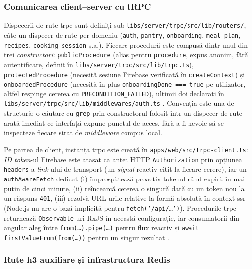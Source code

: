 \subsubsection{Comunicarea client–server cu tRPC}\label{subsec:comunicare-trpc}

Dispecerii de rute \gls{trpc} sunt definiți sub \texttt{libs/server/trpc/src/lib/routers/}, câte un dispecer de rute per domeniu (\texttt{auth}, \texttt{pantry}, \texttt{onboarding}, \texttt{meal-plan}, \texttt{recipes}, \texttt{cooking-session} ș.a.). Fiecare procedură este compusă dintr-unul din trei \textit{constructori}: \texttt{publicProcedure} (alias pentru \texttt{procedure}, expus anonim, fără autentificare, definit în \texttt{libs/server/trpc/src/lib/trpc.ts}), \texttt{protectedProcedure} (necesită sesiune Firebase verificată în \texttt{createContext}) și \texttt{onboardedProcedure} (necesită în plus \texttt{onboardingDone === true} pe utilizator, altfel respinge cererea cu \texttt{PRECONDITION\_FAILED}), ultimii doi declarați în \texttt{libs/\allowbreak server/\allowbreak trpc/\allowbreak src/\allowbreak lib/\allowbreak middlewares/\allowbreak auth.ts} \cite{trpc,trpc_middleware}. Convenția este una de structură: o căutare cu \texttt{grep} prin constructorul folosit într-un dispecer de rute arată imediat ce interfață expune punctul de acces, fără a fi nevoie să se inspecteze fiecare strat de \textit{middleware} compus local.

Pe partea de client, instanța \gls{trpc} este creată în \texttt{apps/web/src/trpc-client.ts}: \textit{ID token}-ul Firebase este atașat ca antet HTTP \texttt{Authorization} prin opțiunea \texttt{headers} a \textit{link}-ului de transport (un \textit{signal} reactiv citit la fiecare cerere), iar un \texttt{authAwareFetch} dedicat (i) împrospătează proactiv tokenul când expiră în mai puțin de cinci minute, (ii) reîncearcă cererea o singură dată cu un token nou la un răspuns \texttt{401}, (iii) rezolvă URL-urile relative la formă absolută în context \acrshort{ssr} (Node.js nu are o bază implicită pentru \texttt{fetch('/api/\ldots')}). Procedurile \gls{trpc} returnează \texttt{Observable}-uri RxJS în această configurație, iar consumatorii din \gls{angular} aleg între \texttt{from(\ldots).pipe(\ldots)} pentru flux reactiv și \texttt{await firstValueFrom(from(\ldots))} pentru un singur rezultat \cite{trpc}.

\subsubsection{Rute h3 auxiliare și infrastructura Redis}\label{subsec:rute-h3-redis}

